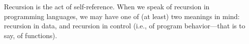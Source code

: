 \label{sec9}\secdown

Recursion is the act of self-reference. When we speak of recursion in
programming languages, we may have one of (at least) two meanings in mind:
recursion in data, and recursion in control (i.e., of program behavior—that is
to say, of functions).





\secup
